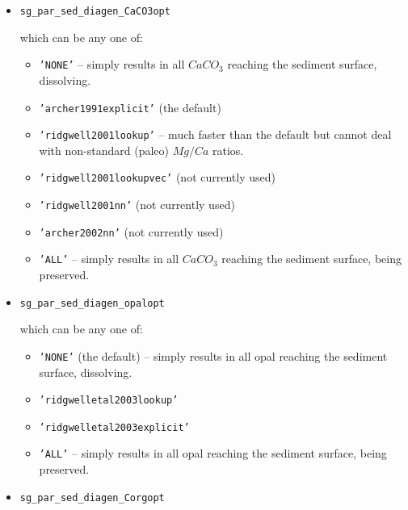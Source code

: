 \begin{enumerate}[noitemsep]
\begin{itemize}[noitemsep]
\vspace{1mm}
\item
\vspace{-0mm}\small\begin{verbatim}
sg_par_sed_diagen_CaCO3opt
\end{verbatim}\normalsize\vspace{-0mm}
which can be any one of:
\begin{itemize}[noitemsep]
\item \texttt{'NONE'} -- simply results in all \(CaCO_{3}\) reaching the sediment surface, dissolving.
\item \texttt{'archer1991explicit'} (the default)
\item \texttt{'ridgwell2001lookup'} -- much faster than the default but cannot deal with non-standard (paleo) \(Mg/Ca\) ratios.
\item \texttt{'ridgwell2001lookupvec'} (not currently used)
\item \texttt{'ridgwell2001nn'} (not currently used)
\item \texttt{'archer2002nn'} (not currently used)
\item \texttt{'ALL'} -- simply results in all \(CaCO_{3}\) reaching the sediment surface, being preserved.
\end{itemize}
\vspace{1mm}
\item
\vspace{-0mm}\small\begin{verbatim}
sg_par_sed_diagen_opalopt
\end{verbatim}\normalsize\vspace{-0mm}
which can be any one of:
\begin{itemize}[noitemsep]
\item \texttt{'NONE'} (the default) -- simply results in all opal reaching the sediment surface, dissolving.
\item \texttt{'ridgwelletal2003lookup'}
\item \texttt{'ridgwelletal2003explicit'}
\item \texttt{'ALL'} -- simply results in all opal reaching the sediment surface, being preserved.
\end{itemize}
\vspace{1mm}
\item
\vspace{-0mm}\small\begin{verbatim}
sg_par_sed_diagen_Corgopt

\end{verbatim}
\end{itemize}
\end{enumerate}
